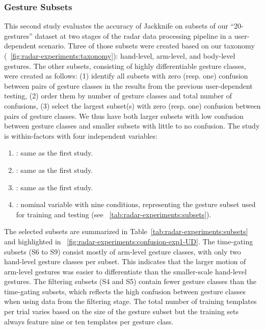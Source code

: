\subsubsection{Gesture Subsets} \label{sec:radar-experiments:gesture-subsets:protocol:gesture-subsets}
This second study evaluates the accuracy of Jackknife on subsets of our ``20-gestures'' dataset at two stages of the radar data processing pipeline in a user-dependent scenario. Three of those subsets were created based on our taxonomy (\fig~\ref{fig:radar-experiments:taxonomy}): hand-level, arm-level, and body-level gestures. The other subsets, consisting of highly differentiable gesture classes, were created as follows: (1) identify all subsets with zero (resp. one) confusion between pairs of gesture classes in the results from the previous user-dependent testing, (2) order them by number of gesture classes and total number of confusions, (3) select the largest subset(s) with zero (resp. one) confusion between pairs of gesture classes. We thus have both larger subsets with low confusion between gesture classes and smaller subsets with little to no confusion.  The study is within-factors with four independent variables:
\begin{enumerate}
    \item {}: same as the first study.
    \item {}: same as the first study.
    \item {}: same as the first study.
    \item {}: nominal variable with nine conditions, representing the gesture subset used for training and testing (see \tab~\ref{tab:radar-experiments:subsets}).
\end{enumerate}
The selected subsets are summarized in Table~\ref{tab:radar-experiments:subsets} and highlighted in \fig~\ref{fig:radar-experiments:confusion-exp1-UD}. 
The time-gating subsets (S6 to S9) consist mostly of arm-level gesture classes, with only two hand-level gesture classes per subset. This indicates that the larger motion of arm-level gestures was easier to differentiate than the smaller-scale hand-level gestures. The filtering subsets (S4 and S5) contain fewer gesture classes than the time-gating subsets, which reflects the high confusion between gesture classes when using data from the filtering stage.
The total number of training templates per trial varies based on the size of the gesture subset but the training sets always feature nine or ten templates per gesture class.

